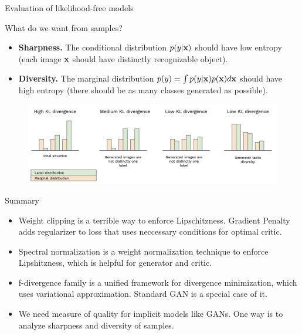 \begin{frame}{Evaluation of likelihood-free models}
	\begin{block}{What do we want from samples?}
		\begin{itemize}
			\item \textbf{Sharpness.}
			The conditional distribution $p(y | \mathbf{x})$ should have low entropy (each image $\mathbf{x}$ should have distinctly recognizable object).
			\item \textbf{Diversity.}
			The marginal distribution $p(y) = \int p(y | \mathbf{x}) p(\mathbf{x}) d \mathbf{x}$ should have high entropy (there should be as many classes generated as possible).
		\end{itemize}
	\end{block}
	\begin{figure}
		\centering
		\includegraphics[width=1.0\linewidth]{figs/is_toy}
	\end{figure}
\end{frame}
\begin{frame}{Summary}
	\begin{itemize} 
		\item Weight clipping is a terrible way to enforce Lipschitzness. Gradient Penalty adds regularizer to loss that uses neccessary conditions for optimal critic.
		\vfill
		\item Spectral normalization is a weight normalization technique to enforce Lipshitzness, which is helpful for generator and critic.
		\vfill
		\item f-divergence family is a unified framework for divergence minimization, which uses variational approximation. Standard GAN is a special case of it.
		\vfill
		\item We need measure of quality for implicit models like GANs. One way is to analyze sharpness and diversity of samples.
	\end{itemize}
\end{frame}
 